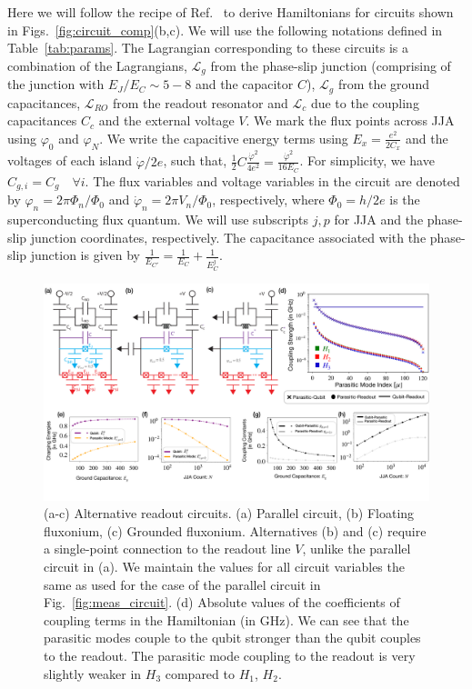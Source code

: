 \documentclass[%
reprint,
superscriptaddress,
 amsmath,amssymb,
 aps,
 prx,
longbibliography,
floatfix,
]{revtex4-2}
\begin{document}
Here we will follow the recipe of Ref.~\cite{viola2015collective} to derive Hamiltonians for circuits shown in Figs.~\ref{fig:circuit_comp}(b,c). We will use the following notations defined in Table~\ref{tab:params}. The Lagrangian corresponding to these circuits is a combination of the Lagrangians, $\mathcal{L}_g$ from the phase-slip junction (comprising of the junction with $E_J/E_C\sim 5-8$ and the capacitor $C$), $\mathcal{L}_{g}$ from the ground capacitances, $\mathcal{L}_{RO}$ from the readout resonator and $\mathcal{L}_c$ due to the coupling capacitances $C_c$ and the external voltage $V$. We mark the flux points across JJA using $\varphi_0$ and $\varphi_{N}$. We write the capacitive energy terms using $E_x=\frac{e^2}{2C_x}$ and the voltages of each island $\dot{\varphi}/2e$, such that, $\frac{1}{2}C\frac{\dot{\varphi}^2}{4e^2}=\frac{\dot{\varphi}^2}{16E_C}$. For simplicity, we have $C_{g,i}=C_g\quad\forall i$. The flux variables and voltage variables in the circuit are denoted by $\varphi_n=2\pi\Phi_n/\Phi_0$ and $\dot{\varphi}_n=2\pi V_n/\Phi_0$, respectively, where $\Phi_0=h/2e$ is the superconducting flux quantum. We will use subscripts $j, p$ for JJA and the phase-slip junction coordinates, respectively. The capacitance associated with the phase-slip junction is given by $\frac{1}{E_{C'}}=\frac{1}{E_C}+\frac{1}{E^{j}_{C}}$.
\begin{figure}
    \centering
    \includegraphics[width=\linewidth]{Figures/Circuit_choice.pdf}
    \caption{(a-c) Alternative readout circuits. (a) Parallel circuit, (b) Floating fluxonium, (c) Grounded fluxonium. Alternatives (b) and (c) require a single-point connection to the readout line $V$, unlike the parallel circuit in (a). We maintain the values for all circuit variables the same as used for the case of the parallel circuit in Fig.~\ref{fig:meas_circuit}. (d) Absolute values of the coefficients of coupling terms in the Hamiltonian (in GHz). We can see that the parasitic modes couple to the qubit stronger than the qubit couples to the readout. The parasitic mode coupling to the readout is very slightly weaker in $H_3$ compared to $H_1$, $H_2$. }
    \label{fig:circuit_choice}
\end{figure}
\end{document}
